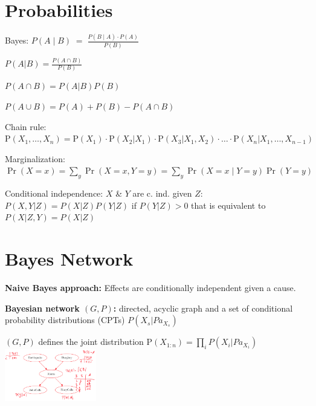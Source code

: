\documentclass[a4paper, 11pt, landscape]{article}
\begin{document}
	\begin{multicols*}{3}
		
		\section{Probabilities}
		\begin{compactitem}[]
			\item[] Bayes: $P(A\mid B) \; = \; \frac {P(B\mid A) \cdot P(A)} {P(B)}$
			\item[] $P(A|B)={\frac {P(A\cap B)}{P(B)}}$
			\item[] $P(A\cap B)=P(A|B)P(B)$
			\item[] $P(A\cup B)=P(A)+P(B)-{{P(A\cap B)}}$
			\item[] Chain rule:  $\mathrm {P} (X_{1},\ldots ,X_{n})=\mathrm {P} (X_{1})\cdot\mathrm{P} (X_{2}| X_{1})\cdot\mathrm{P} (X_{3}| X_{1}, X_{2}) \cdot \ldots \cdot  \mathrm {P} (X_{n} | X_{1},\ldots ,X_{n-1})$
			\item[] Marginalization: $ \Pr(X=x)=\sum _{y}\Pr(X=x,Y=y)=\sum _{y}\Pr(X=x\mid Y=y)\Pr(Y=y)$
			\item[] Conditional independence: $X$ \& $Y$ are c. ind. given $Z$: $P(X, Y| Z) = P(X|Z) P(Y|Z)$ if $P(Y|Z) > 0$ that is equivalent to $P(X|Z,Y) = P (X | Z)$
		\end{compactitem}
	
	
		\section{Bayes Network}
		\textbf{Naive Bayes approach:} Effects are conditionally independent given a cause.
		
		\textbf{Bayesian network $(G,P)$:} directed, acyclic graph and a set of conditional probability distributions (CPTs) $P(X_s| Pa_{X_{s}})$
		
		 $(G,P)$ defines the joint distribution $\mathrm {P} (X_{1:n}) = \prod_{i} P(X_i| Pa_{X_{i}})$  
		\includegraphics[width=0.3\textwidth]{img/pai1.png}
		 

\end{multicols*}
\end{document}

